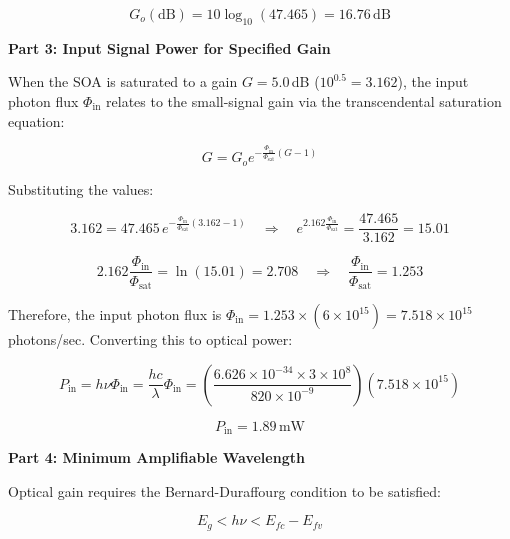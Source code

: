 \begin{equation*}
  \boxed{G_o (\text{dB}) = 10 \log_{10}(47.465) = 16.76\,\text{dB}}
\end{equation*}

\textbf{Part 3: Input Signal Power for Specified Gain}

When the SOA is saturated to a gain $G = 5.0$\,dB ($10^{0.5} = 3.162$), the input photon flux $\Phi_{\text{in}}$ relates to the small-signal gain via the transcendental saturation equation:

\begin{equation*}
  G = G_o e^{-\frac{\Phi_{\text{in}}}{\Phi_{\text{sat}}} (G - 1)}
\end{equation*}

Substituting the values:

\begin{equation*}
  3.162 = 47.465\,e^{-\frac{\Phi_{\text{in}}}{\Phi_{\text{sat}}} (3.162 - 1)} \quad\Longrightarrow\quad e^{2.162 \frac{\Phi_{\text{in}}}{\Phi_{\text{sat}}}} = \frac{47.465}{3.162} = 15.01
\end{equation*}

\begin{equation*}
  2.162 \frac{\Phi_{\text{in}}}{\Phi_{\text{sat}}} = \ln(15.01) = 2.708 \quad\Longrightarrow\quad \frac{\Phi_{\text{in}}}{\Phi_{\text{sat}}} = 1.253
\end{equation*}

Therefore, the input photon flux is $\Phi_{\text{in}} = 1.253 \times (6 \times 10^{15}) = 7.518 \times 10^{15}$\,photons/sec. Converting this to optical power:

\begin{equation*}
  P_{\text{in}} = h\nu \Phi_{\text{in}} = \frac{hc}{\lambda} \Phi_{\text{in}} = \left( \frac{6.626 \times 10^{-34} \times 3 \times 10^8}{820 \times 10^{-9}} \right) (7.518 \times 10^{15})
\end{equation*}

\begin{equation*}
  \boxed{P_{\text{in}} = 1.89\,\text{mW}}
\end{equation*}

\textbf{Part 4: Minimum Amplifiable Wavelength}

Optical gain requires the Bernard-Duraffourg condition to be satisfied:

\begin{equation*}
  E_g < h\nu < E_{fc} - E_{fv}
\end{equation*}


